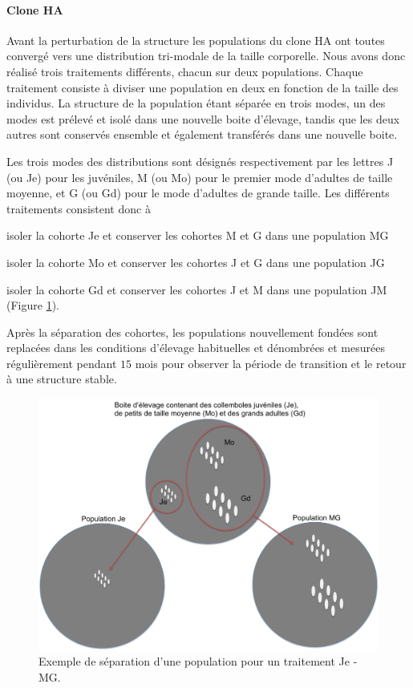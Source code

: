 \paragraph{Clone HA} Avant la perturbation de la structure les populations du
clone HA ont toutes convergé vers une distribution tri-modale de la taille
corporelle. Nous avons donc réalisé trois traitements différents, chacun sur
deux populations. Chaque traitement consiste à diviser une population en deux en
fonction de la taille des individus. La structure de la population étant séparée
en trois modes, un des modes est prélevé et isolé dans une nouvelle boite
d'élevage, tandis que les deux autres sont conservés ensemble et également
transférés dans une nouvelle boite.

Les trois modes des distributions sont désignés respectivement par les lettres J
(ou Je) pour les juvéniles, M (ou Mo) pour le premier mode d'adultes de
taille moyenne, et G (ou Gd) pour le mode d'adultes de grande taille. Les
différents traitements consistent donc à \begin{enumerate*}[label=(\roman*), before=\unskip{ : }, itemjoin={{ ; }},
itemjoin*={{ ; et }}]
\item isoler la cohorte Je et conserver les cohortes M et G dans une population
MG
\item isoler la cohorte Mo et conserver les cohortes J et G dans une population
JG
\item isoler la cohorte Gd et conserver les cohortes J et M dans une population
JM (Figure \ref{fig:SM0}).
\end{enumerate*} 
Après la séparation des cohortes, les populations nouvellement fondées sont
replacées dans les conditions d'élevage habituelles et dénombrées et mesurées
régulièrement pendant $15$ mois pour observer la période de transition et le
retour à une structure stable. 

\begin{figure}[!ht]
\begin{center}
\includegraphics[width=1\textwidth]{1_CorpsDeThese/Resumes/Fig/SM00}
\caption[Exemple de
séparation d'une population]{Exemple de
séparation d'une population pour un traitement Je - MG.}
\label{fig:SM0}
\end{center}
\end{figure}


